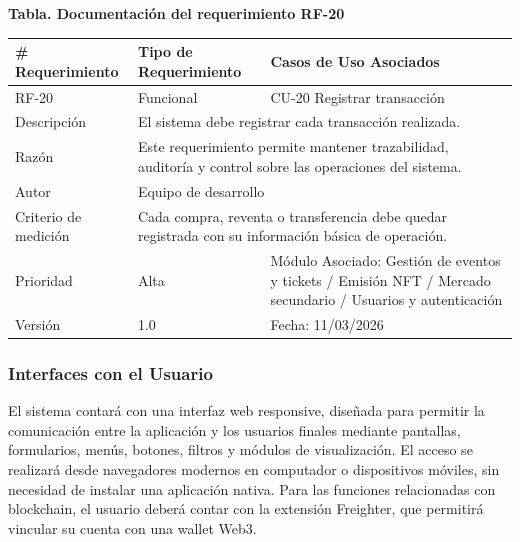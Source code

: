 \documentclass[12pt,letterpaper]{article}
\begin{document}
\noindent
\begin{minipage}{\textwidth}
\centering
\scriptsize
\renewcommand{\arraystretch}{0.9}
\setlength{\tabcolsep}{3pt}
\setlength{\arrayrulewidth}{0.5pt}

\textbf{Tabla. Documentación del requerimiento RF-20}

\vspace{2pt}

\begin{tabularx}{\textwidth}{|p{2.6cm}|X|p{3.4cm}|}
\hline
\# Requerimiento & Tipo de Requerimiento & Casos de Uso Asociados \\ \hline
RF-20 & Funcional & CU-20 Registrar transacción \\ \hline
Descripción & \multicolumn{2}{X|}{El sistema debe registrar cada transacción realizada.} \\ \hline
Razón & \multicolumn{2}{X|}{Este requerimiento permite mantener trazabilidad, auditoría y control sobre las operaciones del sistema.} \\ \hline
Autor & \multicolumn{2}{X|}{Equipo de desarrollo} \\ \hline
Criterio de medición & \multicolumn{2}{X|}{Cada compra, reventa o transferencia debe quedar registrada con su información básica de operación.} \\ \hline
Prioridad & Alta & Módulo Asociado: Gestión de eventos y tickets / Emisión NFT / Mercado secundario / Usuarios y autenticación \\ \hline
Versión & 1.0 & Fecha: 11/03/2026 \\ \hline
\end{tabularx}
\end{minipage}

\vspace{0.2cm}

\subsubsection{Interfaces con el Usuario}
El sistema contará con una interfaz web responsive, diseñada para permitir la comunicación entre la aplicación y los usuarios finales mediante pantallas, formularios, menús, botones, filtros y módulos de visualización. El acceso se realizará desde navegadores modernos en computador o dispositivos móviles, sin necesidad de instalar una aplicación nativa. Para las funciones relacionadas con blockchain, el usuario deberá contar con la extensión Freighter, que permitirá vincular su cuenta con una wallet Web3.
\end{document}
